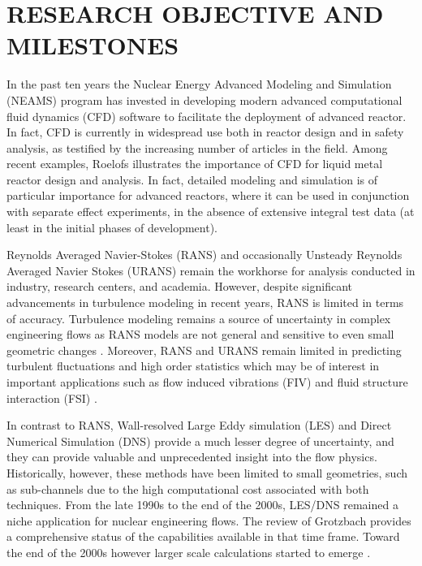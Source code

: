 \documentclass[11pt,letterpaper,english]{article}
\begin{document}
\vspace{-.25in}
\section{RESEARCH OBJECTIVE AND MILESTONES}
\vspace{-.2in}

In the past ten years the Nuclear Energy Advanced Modeling and Simulation (NEAMS) program \cite{sofu2017us} has invested in developing modern advanced computational fluid dynamics (CFD) software to facilitate the deployment of advanced reactor. In fact, CFD is currently in widespread use both in reactor design and in safety analysis, as testified by the increasing number of articles in the field. Among recent examples, Roelofs \cite{roelofs2018thermal} illustrates the importance of CFD for liquid metal reactor design and analysis. In fact, detailed modeling and simulation is of particular importance for advanced reactors,  where it can be used in conjunction with separate effect experiments, in the absence of extensive integral test data (at least in the initial phases of development).

Reynolds Averaged Navier-Stokes (RANS) \cite{conner2010cfd} and occasionally Unsteady Reynolds Averaged Navier Stokes (URANS) remain the workhorse for analysis conducted in industry, research centers, and academia.  However, despite significant advancements in turbulence modeling in recent years, RANS is limited in terms of accuracy. Turbulence modeling remains a source of uncertainty in complex engineering flows as RANS models are not general and sensitive to even small geometric changes \cite{merzari2010numerical}. Moreover, RANS and URANS remain limited in predicting turbulent fluctuations and high order statistics which may be of interest in important applications such as flow induced vibrations (FIV) and fluid structure interaction (FSI) \cite{yuan2017flow}.

In contrast to RANS, Wall-resolved Large Eddy simulation (LES) and Direct Numerical Simulation (DNS) provide a much lesser degree of uncertainty, and they can provide valuable and unprecedented insight into the flow physics. Historically, however, these methods have been limited to small geometries, such as sub-channels \cite{grotzbach1999direct} due to the high computational cost associated with both techniques. From the late 1990s to the end of the 2000s, LES/DNS remained a niche application for nuclear engineering flows. The review of Grotzbach \cite{grotzbach1999direct} provides a comprehensive status of the capabilities available in that time frame. Toward the end of the 2000s however larger scale calculations started to emerge \cite{pointer2009simulations}.
\end{document}
